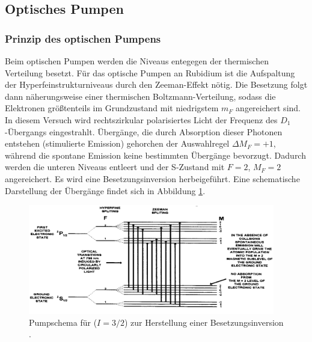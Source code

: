 \subsection{Optisches Pumpen}
\label{subsec:prinzipOptischesPumpen} 

\subsubsection{Prinzip des optischen Pumpens}

Beim optischen Pumpen werden die Niveaus entegegen der thermischen Verteilung besetzt.
Für das optische Pumpen an Rubidium ist die Aufspaltung der Hyperfeinstrukturniveaus durch den Zeeman-Effekt nötig. Die Besetzung folgt dann näherungsweise einer thermischen Boltzmann-Verteilung, sodass die Elektronen größtenteils im Grundzustand mit niedrigstem $m_F$ angereichert sind.\\
In diesem Versuch wird rechtszirkular polarisiertes Licht der Frequenz des $D_1$-Übergangs eingestrahlt. Übergänge, die durch Absorption dieser Photonen entstehen (stimulierte Emission) gehorchen der Auswahlregel $\Delta M_F=+1$, während die spontane Emission keine bestimmten Übergänge bevorzugt. Dadurch werden die unteren Niveaus entleert und der S-Zustand mit $F=2$, $M_F=2$ angereichert. Es wird eine Besetzungsinversion herbeigeführt. Eine schematische Darstellung der Übergänge findet sich in Abbildung \ref{fig:pumpschema}.

\begin{figure}
	\centering
	\includegraphics[width=0.96\textwidth,keepaspectratio]{content/images/pumpschema.png}
	\caption{Pumpschema für  ($I=3/2$) zur Herstellung einer Besetzungsinversion \cite{caltech}.}
    \label{fig:pumpschema}
\end{figure}


